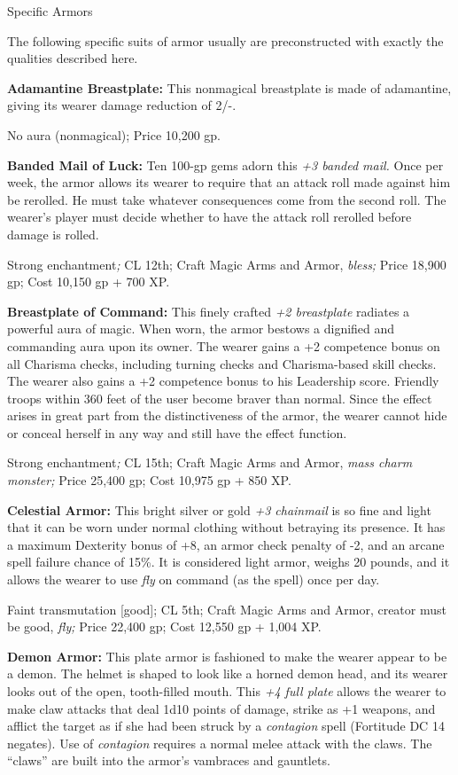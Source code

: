 \documentclass{article}
\begin{document}
\vspace{12pt}
Specific Armors

The following specific suits of armor usually are preconstructed with exactly the 
qualities described here.

\textbf{Adamantine Breastplate:} This nonmagical breastplate is made of adamantine, 
giving its wearer damage reduction of 2/-.

No aura (nonmagical); Price 10,200 gp.

\textbf{Banded Mail of Luck:} Ten 100-gp gems adorn this \textit{+3 banded mail. 
}Once per week, the armor allows its wearer to require that an attack roll made 
against him be rerolled. He must take whatever consequences come from the second 
roll. The wearer's player must decide whether to have the attack roll rerolled 
before damage is rolled.

Strong enchantment\textit{; }CL 12th; Craft Magic Arms and Armor, \textit{bless; 
}Price 18,900 gp; Cost 10,150 gp + 700 XP.

\textbf{Breastplate of Command: }This finely crafted \textit{+2 breastplate }radiates 
a powerful aura of magic. When worn, the armor bestows a dignified and commanding 
aura upon its owner. The wearer gains a +2 competence bonus on all Charisma checks, 
including turning checks and Charisma-based skill checks. The wearer also gains 
a +2 competence bonus to his Leadership score. Friendly troops within 360 feet 
of the user become braver than normal. Since the effect arises in great part from 
the distinctiveness of the armor, the wearer cannot hide or conceal herself in 
any way and still have the effect function.

Strong enchantment\textit{; }CL 15th; Craft Magic Arms and Armor, \textit{mass 
charm monster; }Price 25,400 gp; Cost 10,975 gp + 850 XP.

\textbf{Celestial Armor:} This bright silver or gold \textit{+3 chainmail }is so 
fine and light that it can be worn under normal clothing without betraying its 
presence. It has a maximum Dexterity bonus of +8, an armor check penalty of -2, 
and an arcane spell failure chance of 15\%. It is considered light armor, weighs 
20 pounds, and it allows the wearer to use \textit{fly }on command (as the spell) 
once per day.

Faint transmutation [good]; CL 5th; Craft Magic Arms and Armor, creator must be 
good, \textit{fly; }Price 22,400 gp; Cost 12,550 gp + 1,004 XP.

\textbf{Demon Armor: }This plate armor is fashioned to make the wearer appear to 
be a demon. The helmet is shaped to look like a horned demon head, and its wearer 
looks out of the open, tooth-filled mouth. This \textit{+4 full plate }allows the 
wearer to make claw attacks that deal 1d10 points of damage, strike as +1 weapons, 
and afflict the target as if she had been struck by a \textit{contagion }spell 
(Fortitude DC 14 negates). Use of \textit{contagion }requires a normal melee attack 
with the claws. The ``claws'' are built into the armor's vambraces and gauntlets. 
\end{document}
